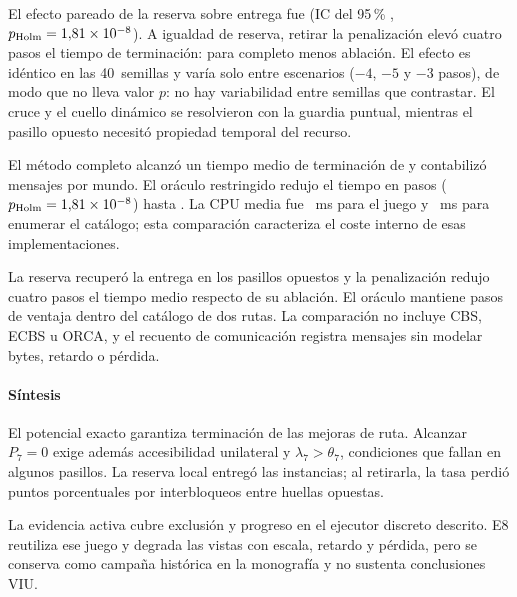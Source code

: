 El efecto pareado de la reserva sobre entrega fue \SPSevenHOneEffect{} (IC del 95\,\% \SPSevenHOneCI{}, $p_{\mathrm{Holm}}=1{,}81\times10^{-8}$). A igualdad de reserva, retirar la penalización elevó cuatro pasos el tiempo de terminación: \SPSevenHTwoEffect{} para completo menos ablación. El efecto es idéntico en las 40~semillas y varía solo entre escenarios ($-4$, $-5$ y $-3$ pasos), de modo que no lleva valor $p$: no hay variabilidad entre semillas que contrastar. El cruce y el cuello dinámico se resolvieron con la guardia puntual, mientras el pasillo opuesto necesitó propiedad temporal del recurso.


El método completo alcanzó un tiempo medio de terminación de \SPSevenProposedMakespan{} y contabilizó \SPSevenProposedMessages{} mensajes por mundo. El oráculo restringido redujo el tiempo en \SPSevenHThreeEffect{} pasos ($p_{\mathrm{Holm}}=1{,}81\times10^{-8}$) hasta \SPSevenOracleMakespan{}. La CPU media fue \SPSevenProposedRuntime{}~ms para el juego y \SPSevenOracleRuntime{}~ms para enumerar el catálogo; esta comparación caracteriza el coste interno de esas implementaciones.

La reserva recuperó la entrega en los pasillos opuestos y la penalización redujo cuatro pasos el tiempo medio respecto de su ablación. El oráculo mantiene \SPSevenHThreeEffect{} pasos de ventaja dentro del catálogo de dos rutas. La comparación no incluye CBS, ECBS u ORCA, y el recuento de comunicación registra mensajes sin modelar bytes, retardo o pérdida.

\paragraph{Síntesis}

El potencial exacto garantiza terminación de las mejoras de ruta. Alcanzar $P_7=0$ exige además accesibilidad unilateral y $\lambda_7>\theta_7$, condiciones que fallan en algunos pasillos. La reserva local entregó las \SPSevenWorlds{} instancias; al retirarla, la tasa perdió \SPSevenHOneEffectPP{} puntos porcentuales por interbloqueos entre huellas opuestas.

La evidencia activa cubre exclusión y progreso en el ejecutor discreto descrito. E8 reutiliza ese juego y degrada las vistas con escala, retardo y pérdida, pero se conserva como campaña histórica en la monografía y no sustenta conclusiones VIU.
